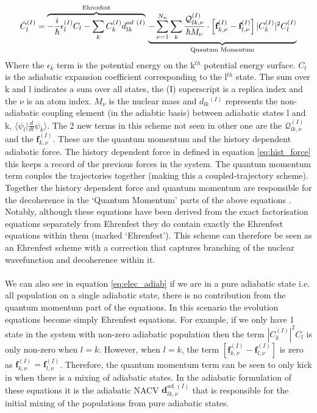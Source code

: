 \begin{dmath}
  \dot{C}_{l}^{(I)} =
  \overbrace{
    -\frac{i}{\hbar} \epsilon_l^{(I)} C_{l}
    - \sum_k C_k^{(I)} d_{lk}^{ad \ (I)}
  }^{\text{Ehrenfest}}
  \\
  \underbrace{
    - \sum_{\nu=1}^{N_n}\sum_{k} \frac{\mathcal{Q}_{lk, \nu}^{(I)}}{\hbar M_\nu} \cdot \left[ \textbf{f}_{k,\nu}^{(I)} - \textbf{f}_{l,\nu}^{(I)} \right] |C_{k}^{(I)}|^2 C_{l}^{(I)}
  }_{\text{Quantum Momentum}}
  \label{eq:elec_adiab}
\end{dmath}
Where the $\epsilon_k$ term is the potential energy on the k$^{th}$ potential energy surface. $C_l$ is the adiabatic expansion coefficient corresponding to the l$^{th}$ state. The sum over k and l indicates a sum over all states, the (I) superscript is a replica index and the $\nu$ is an atom index. $M_{\nu}$ is the nuclear mass and $d_{lk}{^(I)}$ represents the non-adiabatic coupling element (in the adiabtic basis) between adiabatic states l and k, $\langle \psi_{l} \vert \frac{d}{dt}\psi_{k} \rangle$.
The 2 new terms in this scheme not seen in other one are the $\mathcal{Q}_{lk, \nu}^{(I)}$ and the $\textbf{f}_{k, \nu}^{(I)}$. These are the quantum momentum and the history dependent adiabatic force. The history dependent force in defined in equation \eqref{eq:hist_force} this keeps a record of the previous forces in the system. The quantum momentum term couples the trajectories together (making this a coupled-trajectory scheme). Together the history dependent force and quantum momentum are responsible for the decoherence in the `Quantum Momentum' parts of the
above equations \cite{gossel_coupled-trajectory_2018}. Notably, although these equations have been derived from the exact factorisation equations separately from Ehrenfest they do contain exactly the Ehrenfest equations within them (marked `Ehrenfest'). This scheme can therefore be seen as an Ehrenfest scheme with a correction that captures branching of the nuclear wavefunction and decoherence within it.
\\\\
We can also see in equation \eqref{eq:elec_adiab} if we are in a pure adiabatic state i.e. all population on a single adiabatic state, there is no contribution from the quantum momentum part of the equations. In this scenario the evolution equations become simply Ehrenfest equations. For example, if we only have 1 state in the system with non-zero adiabatic population then the term $|C_{k}^{(I)}|^2 C_{l}$ is only non-zero when $l = k$. However, when $l = k$, the term $\left[ \textbf{f}_{k,\nu}^{(I)} - \textbf{f}_{l,\nu}^{(I)} \right]$ is zero as $\textbf{f}_{k,\nu}^{(I)} = \textbf{f}_{l,\nu}^{(I)}$.
Therefore, the quantum momentum term can be seen to only kick in when there is a mixing of adiabatic states. In the adiabatic formulation of these equations it is the adiabatic NACV $\textbf{d}_{lk, \nu}^{ad, (I)}$ that is responsible for the initial mixing of the populations from pure adiabatic states.

